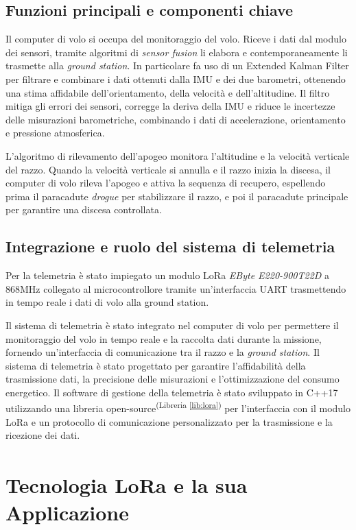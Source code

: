 \documentclass[12pt,a4paper,twoside]{book}
\newcommand{\libref}[1]{\textsuperscript{(Libreria \ref{#1})}}
\begin{document}
\section{Funzioni principali e componenti chiave}
Il computer di volo si occupa del monitoraggio del volo. Riceve i dati dal modulo
dei sensori, tramite algoritmi di \emph{sensor fusion} li elabora e
contemporaneamente li trasmette alla \emph{ground station}.
In particolare fa uso di un Extended Kalman Filter per filtrare e combinare i
dati ottenuti dalla \ac{IMU} e dei due barometri, ottenendo una stima
affidabile dell'orientamento, della velocità e dell'altitudine.
Il filtro mitiga gli errori dei sensori, corregge la deriva della \ac{IMU} e riduce
le incertezze delle misurazioni barometriche, combinando i dati di accelerazione,
orientamento e pressione atmosferica.

L'algoritmo di rilevamento dell'apogeo monitora l'altitudine e la velocità verticale
del razzo.
Quando la velocità verticale si annulla e il razzo inizia la discesa, il
computer di volo rileva l'apogeo e attiva la sequenza di recupero,
espellendo prima il paracadute \emph{drogue} per stabilizzare il razzo, e poi
il paracadute principale per garantire una discesa controllata.

\section{Integrazione e ruolo del sistema di telemetria}
Per la telemetria è stato impiegato un modulo \ac{LoRa} \emph{EByte E220-900T22D}
a 868MHz collegato al microcontrollore tramite un'interfaccia \ac{UART}
trasmettendo in tempo reale i dati di volo alla ground station.

Il sistema di telemetria è stato integrato nel computer di volo per permettere il
monitoraggio del volo in tempo reale e la raccolta dati durante la missione,
fornendo un'interfaccia di comunicazione tra il razzo e la \emph{ground station}.
Il sistema di telemetria è stato progettato per garantire l'affidabilità della
trasmissione dati, la precisione delle misurazioni e l'ottimizzazione del consumo
energetico.%
Il software di gestione della telemetria è stato sviluppato in C++17 utilizzando
una libreria open-source\libref{lib:lora} per l'interfaccia con il modulo \ac{LoRa}
e un protocollo di comunicazione personalizzato per la trasmissione e la
ricezione dei dati.

\chapter{Tecnologia \texorpdfstring{LoRa\textsuperscript{\textcopyright}}{} e la sua Applicazione} \label{chap:lora}
\end{document}

